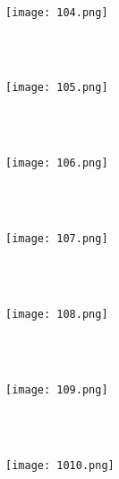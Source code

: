 \quad\\[\intextsep] 
\begin{minipage}{\textwidth} 
  \centering 
  \texttt{[image: 104.png]}%
  \label{fig:non:float} 
\end{minipage} 
\quad\\[\intextsep] 

\quad\\[\intextsep] 
\begin{minipage}{\textwidth} 
  \centering 
  \texttt{[image: 105.png]}%
  \label{fig:non:float} 
\end{minipage} 
\quad\\[\intextsep] 

\quad\\[\intextsep] 
\begin{minipage}{\textwidth} 
  \centering 
  \texttt{[image: 106.png]}%
  \label{fig:non:float} 
\end{minipage} 
\quad\\[\intextsep] 
 
\quad\\[\intextsep] 
\begin{minipage}{\textwidth} 
  \centering 
  \texttt{[image: 107.png]}%
  \label{fig:non:float} 
\end{minipage} 
\quad\\[\intextsep] 
    
\quad\\[\intextsep] 
\begin{minipage}{\textwidth} 
  \centering 
  \texttt{[image: 108.png]}%
  \label{fig:non:float} 
\end{minipage} 
\quad\\[\intextsep] 
       
\quad\\[\intextsep] 
\begin{minipage}{\textwidth} 
  \centering 
  \texttt{[image: 109.png]}%
  \label{fig:non:float} 
\end{minipage} 
\quad\\[\intextsep] 

\quad\\[\intextsep] 
\begin{minipage}{\textwidth} 
  \centering 
  \texttt{[image: 1010.png]}%
  \label{fig:non:float} 
\end{minipage} 
\quad\\[\intextsep] 
  
